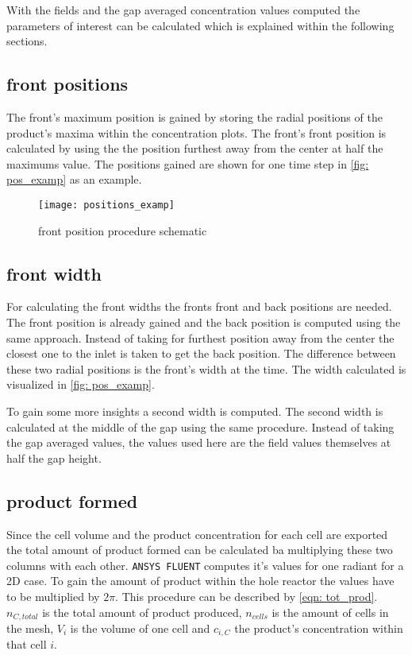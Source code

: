 \documentclass[../thesis.tex]{subfiles}
\begin{document}
With the fields and the gap averaged concentration values computed the parameters of interest can be calculated which is explained within the following sections.

\subsection{front positions}

The front's maximum position is gained by storing the radial positions of the product's maxima within the concentration plots. The front's front position is calculated by using the the position furthest away from the center at half the maximums value. The positions gained are shown for one time step in \autoref{fig: pos_examp} as an example.

\begin{figure}[htb]
	\centering
	\texttt{[image: positions\_examp]}
	\caption{front position procedure schematic}
	\label{fig: pos_examp}
\end{figure}

\subsection{front width}

For calculating the front widths the fronts front and back positions are needed. The front position is already gained and the back position is computed using the same approach. Instead of taking for furthest position away from the center the closest one to the inlet is taken to get the back position. The difference between these two radial positions is the front's width at the time. The width calculated is visualized in \autoref{fig: pos_examp}.

To gain some more insights a second width is computed. The second width is calculated at the middle of the gap using the same procedure. Instead of taking the gap averaged values, the values used here are the field values themselves at half the gap height.

\subsection{product formed}

Since the cell volume and the product concentration for each cell are exported the total amount of product formed can be calculated ba multiplying these two columns with each other. \texttt{ANSYS FLUENT} computes it's values for one radiant for a 2D case. To gain the amount of product within the hole reactor the values have to be multiplied by $2 \pi$. This procedure can be described by \autoref{eqn: tot_prod}. $ n_{C, total} $ is the total amount of product produced, $n_{cells}$ is the amount of cells in the mesh, $ V_i $ is the volume of one cell and $c_{i, C}$ the product's concentration within that cell $i$.
\end{document}
